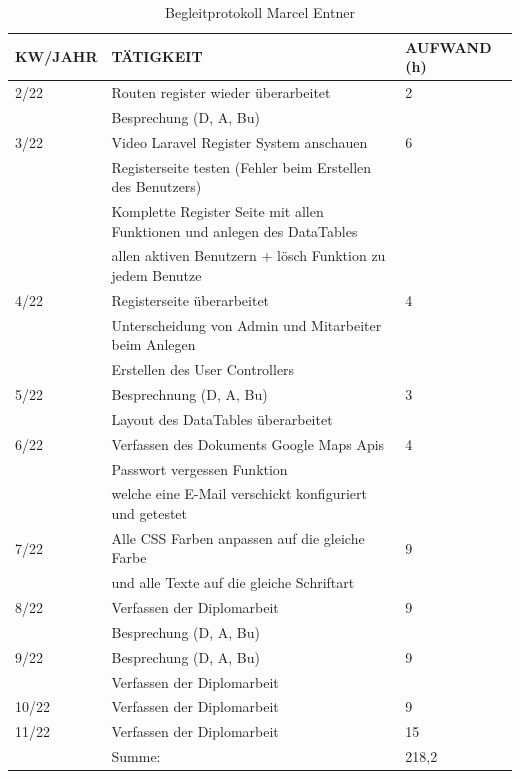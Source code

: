 \begin{table}[h]
	\begin{tabular}{|l|l|l|}
		\hline
		\textbf{KW/JAHR} &     \textbf{TÄTIGKEIT}  & 	\textbf{AUFWAND (h)}    \\ \hline
		
		2/22 & Routen register wieder überarbeitet & 2 \\
			 & Besprechung (D, A, Bu)&\\ \hline
		3/22 & Video Laravel Register System anschauen & 6\\
			 & Registerseite testen (Fehler beim Erstellen des Benutzers) &\\
			 &Komplette Register Seite mit allen Funktionen und anlegen des DataTables &\\
			 &allen aktiven Benutzern + lösch Funktion zu jedem Benutze&\\ \hline
		4/22 &Registerseite überarbeitet & 4\\
			 &Unterscheidung von Admin und Mitarbeiter beim Anlegen &\\
			 &Erstellen des User Controllers&\\ \hline
		5/22 &Besprechnung (D, A, Bu)& 3\\
			 &Layout des DataTables überarbeitet& \\ \hline
		6/22 & Verfassen des Dokuments Google Maps Apis& 4\\
			 &Passwort vergessen Funktion &\\
			 &welche eine E-Mail verschickt konfiguriert und getestet&\\ \hline
		7/22 &Alle CSS Farben anpassen auf die gleiche Farbe & 9\\
			 & und alle Texte auf die gleiche Schriftart &\\ \hline
		8/22 & Verfassen der Diplomarbeit & 9\\
			 &Besprechung (D, A, Bu)& \\ \hline
		9/22 &Besprechung (D, A, Bu) & 9\\ 
			 &Verfassen der Diplomarbeit&\\ \hline
		10/22&Verfassen der Diplomarbeit& 9\\ \hline
		11/22&Verfassen der Diplomarbeit& 15\\ \hline
			 & Summe:  					& 218,2\\ \hline
			 
		
		
		
			 
		
	\end{tabular}
	\caption{Begleitprotokoll Marcel Entner}
\end{table}



